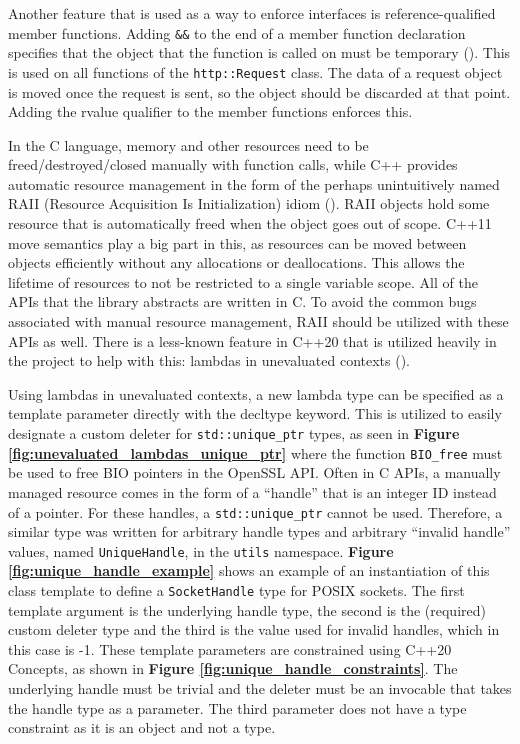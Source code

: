 \documentclass[12pt, a4paper]{article}
\begin{document}
Another feature that is used as a way to enforce interfaces is reference-qualified member functions. Adding \texttt{\&\&} to the end of a member function declaration specifies that the object that the function is called on must be temporary (\cite{CppMemberFunctions}). This is used on all functions of the \texttt{http::Request} class. The data of a request object is moved once the request is sent, so the object should be discarded at that point. Adding the rvalue qualifier to the member functions enforces this.

In the C language, memory and other resources need to be freed/destroyed/closed manually with function calls, while C++ provides automatic resource management in the form of the perhaps unintuitively named RAII (Resource Acquisition Is Initialization) idiom (\cite{CppRAII}). RAII objects hold some resource that is automatically freed when the object goes out of scope. C++11 move semantics play a big part in this, as resources can be moved between objects efficiently without any allocations or deallocations. This allows the lifetime of resources to not be restricted to a single variable scope. All of the APIs that the library abstracts are written in C. To avoid the common bugs associated with manual resource management, RAII should be utilized with these APIs as well. There is a less-known feature in C++20 that is utilized heavily in the project to help with this: lambdas in unevaluated contexts (\cite{UnevaluatedLambdas}).

Using lambdas in unevaluated contexts, a new lambda type can be specified as a template parameter directly with the decltype keyword. This is utilized to easily designate a custom deleter for \texttt{std::unique\_ptr} types, as seen in \textbf{Figure \ref{fig:unevaluated_lambdas_unique_ptr}} where the function \texttt{BIO\_free} must be used to free BIO pointers in the OpenSSL API. Often in C APIs, a manually managed resource comes in the form of a “handle” that is an integer ID instead of a pointer. For these handles, a \texttt{std::unique\_ptr} cannot be used. Therefore, a similar type was written for arbitrary handle types and arbitrary “invalid handle” values, named \texttt{UniqueHandle}, in the \texttt{utils} namespace. \textbf{Figure \ref{fig:unique_handle_example}} shows an example of an instantiation of this class template to define a \texttt{SocketHandle} type for POSIX sockets. The first template argument is the underlying handle type, the second is the (required) custom deleter type and the third is the value used for invalid handles, which in this case is -1. These template parameters are constrained using C++20 Concepts, as shown in \textbf{Figure \ref{fig:unique_handle_constraints}}. The underlying handle must be trivial and the deleter must be an invocable that takes the handle type as a parameter. The third parameter does not have a type constraint as it is an object and not a type.
\end{document}

